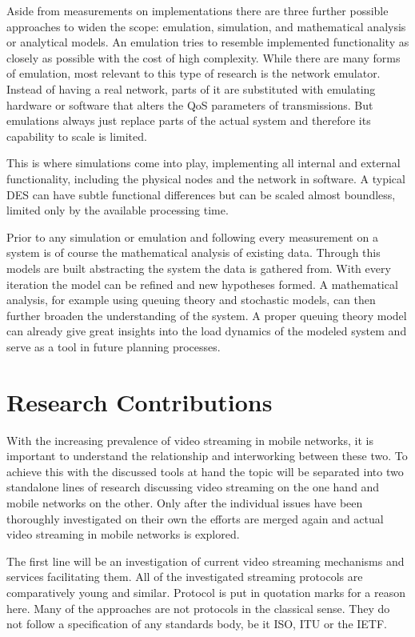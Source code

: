 Aside from measurements on implementations there are three further possible approaches to widen the scope: emulation, simulation, and mathematical analysis or analytical models. An emulation tries to resemble implemented functionality as closely as possible with the cost of high complexity. While there are many forms of emulation, most relevant to this type of research is the network emulator. Instead of having a real network, parts of it are substituted with emulating hardware or software that alters the \gls{QoS} parameters of transmissions. But emulations always just replace parts of the actual system and therefore its capability to scale is limited.

This is where simulations come into play, implementing all internal and external functionality, including the physical nodes and the network in software. A typical \gls{DES} can have subtle functional differences but can be scaled almost boundless, limited only by the available processing time. 

Prior to any simulation or emulation and following every measurement on a system is of course the mathematical analysis of existing data. Through this models are built abstracting the system the data is gathered from. With every iteration the model can be refined and new hypotheses formed.
A mathematical analysis, for example using queuing theory and stochastic models, can then further broaden the understanding of the system. A proper queuing theory model can already give great insights into the load dynamics of the modeled system and serve as a tool in future planning processes.


\section{Research Contributions}

With the increasing prevalence of video streaming in mobile networks, it is important to understand the relationship and interworking between these two. To achieve this with the discussed tools at hand the topic will be separated into two standalone lines of research discussing video streaming on the one hand and mobile networks on the other. Only after the individual issues have been thoroughly investigated on their own the efforts are merged again and actual video streaming in mobile networks is explored.

The first line will be an investigation of current video streaming mechanisms and services facilitating them. All of the investigated streaming protocols are comparatively young and similar. Protocol is put in quotation marks for a reason here. Many of the approaches are not protocols in the classical sense. They do not follow a specification of any standards body, be it \gls{ISO}, \gls{ITU} or the \gls{IETF}. 

